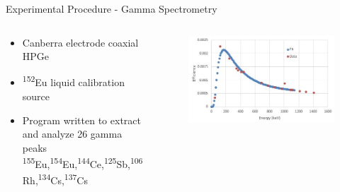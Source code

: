 \documentclass{beamer}
\newcommand{\tss}{\textsuperscript}
\begin{document}
\begin{frame}{Experimental Procedure - Gamma Spectrometry}
  \begin{columns}
    \begin{column}{0.4\textwidth}
      \vspace{-10mm}
      \begin{itemize}
      \item{Canberra electrode coaxial HPGe}
      \item{\tss{152}Eu liquid calibration source}
      \item{Program written to extract and analyze 26 gamma peaks\\}
      {\tiny\tss{155}Eu,\tss{154}Eu,\tss{144}Ce,\tss{125}Sb,\tss{106}Rh,\tss{134}Cs,\tss{137}Cs}
      \end{itemize}
    \end{column}
    \begin{column}{0.7\textwidth}
      \begin{figure}[H]
        \vspace*{-1cm}
        \begin{center}
	  \includegraphics[scale = 0.55]{figures/effgamma}
	\end{center}
      \end{figure}
    \end{column}
  \end{columns}  
\end{frame}
\end{document}
